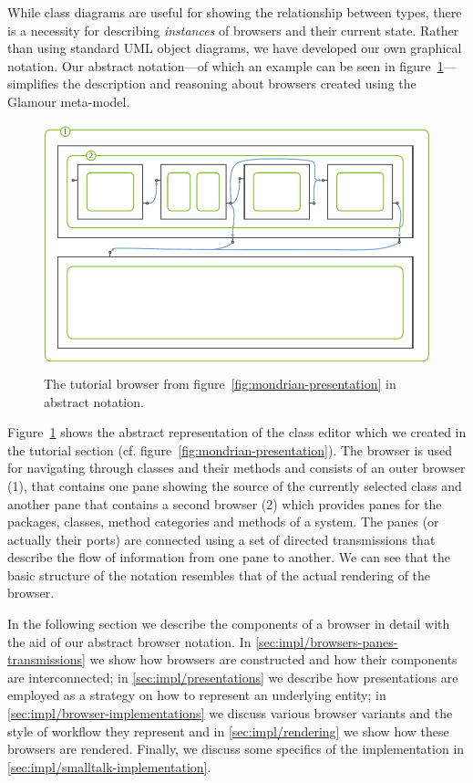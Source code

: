 \documentclass[a4paper,10pt,twoside]{book}
\begin{document}
While class diagrams are useful for showing the relationship between
types, there is a necessity for describing \emph{instances} of
browsers and their current state. Rather than using standard UML
object diagrams, we have developed our own graphical notation. Our
abstract notation---of which an example can be seen in
figure~\ref{fig:schematic-browser}---simplifies the description and
reasoning about browsers created using the Glamour meta-model.

\begin{figure}[htbp]
\centerline{\includegraphics[width=\linewidth]{schematic_browser.pdf}}
\caption{The tutorial browser from figure~\ref{fig:mondrian-presentation} in abstract notation.}
\label{fig:schematic-browser}
\end{figure}

Figure~\ref{fig:schematic-browser} shows the abstract representation
of the class editor which we created in the tutorial section
(cf. figure~\ref{fig:mondrian-presentation}). The browser is used for
navigating through classes and their methods and consists of an outer
browser (1), that contains one pane showing the source of the
currently selected class and another pane that contains a second
browser (2) which provides panes for the packages, classes, method
categories and methods of a system. The panes (or actually their
ports) are connected using a set of directed transmissions that
describe the flow of information from one pane to another. We can see
that the basic structure of the notation resembles that of the actual
rendering of the browser.

In the following section we describe the components of a browser in
detail with the aid of our abstract browser notation. In
\ref{sec:impl/browsers-panes-transmissions} we show how browsers are
constructed and how their components are interconnected; in
\ref{sec:impl/presentations} we describe how presentations are
employed as a strategy on how to represent an underlying entity; in
\ref{sec:impl/browser-implementations} we discuss various browser
variants and the style of workflow they represent and in
\ref{sec:impl/rendering} we show how these browsers are
rendered. Finally, we discuss some specifics of the implementation in
\ref{sec:impl/smalltalk-implementation}.
\end{document}
